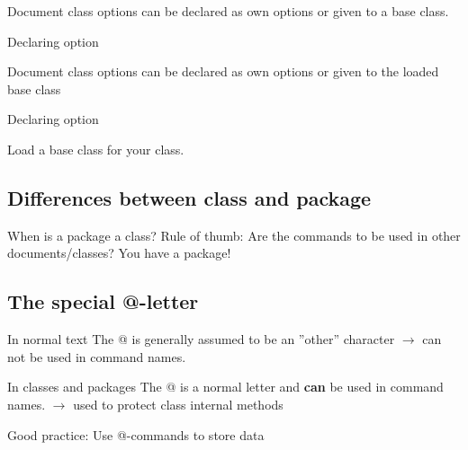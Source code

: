 \begin{frame}
	Document class options can be declared as own options or given to a base class.
	\begin{codeblock}{Declaring option}
		
	\end{codeblock}
\end{frame}

\begin{frame}
	Document class options can be declared as own options or given to the
	loaded base class
	\begin{codeblock}{Declaring option}
		
	\end{codeblock}
	Load a base class for your class.
\end{frame}

\subsection{Differences between class and package}
\begin{frame}
	\begin{block}{When is a package a class?}
		Rule of thumb: Are the commands to be used in other documents/classes?
		You have a package!
	\end{block}
\end{frame}

\subsection{The special @-letter}
\begin{frame}
	\begin{block}{In normal text}
		The @ is generally assumed to be an ''other'' character $\rightarrow$
		can not be used in command names.
	\end{block}

	\begin{block}{In classes and packages}
		The @ is a normal letter and \textbf{can} be used in command names.
		$\rightarrow$ used to protect class internal methods 
	\end{block}

	Good practice: Use @-commands to store data
\end{frame}

